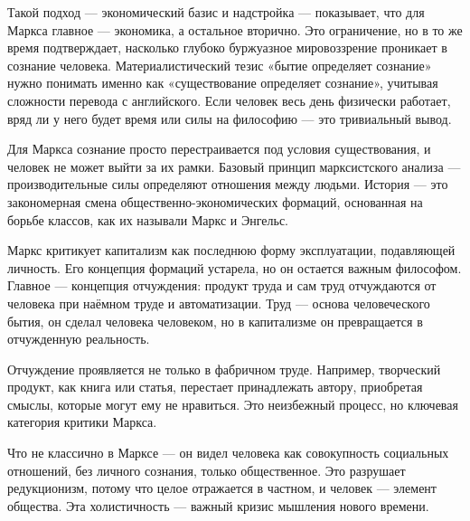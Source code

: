 Такой подход --- экономический базис и надстройка --- показывает, что для Маркса главное --- экономика, а остальное вторично. Это ограничение, но в то же время подтверждает, насколько глубоко буржуазное мировоззрение проникает в сознание человека. Материалистический тезис «бытие определяет сознание» нужно понимать именно как «существование определяет сознание», учитывая сложности перевода с английского. Если человек весь день физически работает, вряд ли у него будет время или силы на философию --- это тривиальный вывод.

Для Маркса сознание просто перестраивается под условия существования, и человек не может выйти за их рамки. Базовый принцип марксистского анализа --- производительные силы определяют отношения между людьми. История --- это закономерная смена общественно-экономических формаций, основанная на борьбе классов, как их называли Маркс и Энгельс.

Маркс критикует капитализм как последнюю форму эксплуатации, подавляющей личность. Его концепция формаций устарела, но он остается важным философом. Главное --- концепция отчуждения: продукт труда и сам труд отчуждаются от человека при наёмном труде и автоматизации. Труд --- основа человеческого бытия, он сделал человека человеком, но в капитализме он превращается в отчужденную реальность.

Отчуждение проявляется не только в фабричном труде. Например, творческий продукт, как книга или статья, перестает принадлежать автору, приобретая смыслы, которые могут ему не нравиться. Это неизбежный процесс, но ключевая категория критики Маркса.

Что не классично в Марксе --- он видел человека как совокупность социальных отношений, без личного сознания, только общественное. Это разрушает редукционизм, потому что целое отражается в частном, и человек --- элемент общества. Эта холистичность --- важный кризис мышления нового времени.



